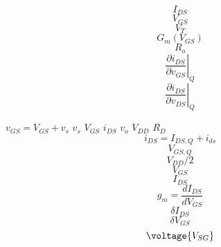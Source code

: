\documentclass[letterpaper 12pt]{book}
\begin{document}
\[ I_{DS} \]
\[ V_{GS} \]
\[ V_T \]
\[ G_m(V_{GS}) \]
\[ R_o \]
\[ \left. \frac{{\partial {i_{DS}}}} {{\partial {v_{GS}}}} \right|_Q \]
\[ \left. \frac{{\partial {i_{DS}}}} {{\partial {v_{DS}}}} \right|_Q \]

$v_{GS} = V_{GS} + v_s$
$v_s$
$ V_{GS}$
$i_{DS} $
$v_o$ 
$V_{DD}$
$R_D$
\[ i_{DS} = I_{DS,Q} + i_{ds} \]
\[ V_{GS,Q} \]
\[ V_{DD}/2 \]
\[ V_{GS} \]
\[ I_{DS} \]
\[ g_m = \frac{dI_{DS}}{dV_{GS}} \]
\[ \delta I_{DS} \]
\[ \delta V_{GS} \]
\[ \voltage{V_{SG}} \]
\end{document}
